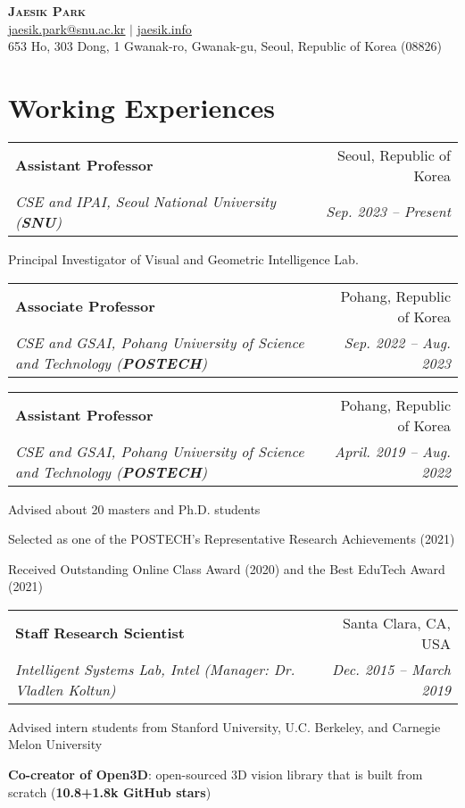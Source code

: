 \documentclass[letterpaper,11pt]{article}
\makeatletter
\newcommand{\resumeItem}[1]{
  \small{
  \item{#1 \vspace{-2pt}}
  }
}
\newcommand{\resumeSubheading}[4]{
  \vspace{-2pt}\item
    \begin{tabular*}{0.97\textwidth}[t]{l@{\extracolsep{\fill}}r}
      \textbf{#1} & #2 \\
      \textit{\small#3} & \textit{\small #4} \\
    \end{tabular*}\vspace{-7pt}
}
\newcommand{\resumeSubHeadingListStart}{\begin{itemize}[leftmargin=0.15in, label={}]}
\newcommand{\resumeSubHeadingListEnd}{\end{itemize}}
\newcommand{\resumeItemListStart}{\begin{itemize}}
\newcommand{\resumeItemListEnd}{\end{itemize}\vspace{-5pt}}
\makeatother
\begin{document}
\begin{center}
    \textbf{\Huge \scshape Jaesik Park} \\ \vspace{3pt}
    \small \href{mailto:jaesik.park@snu.ac.kr}{\underline{jaesik.park@snu.ac.kr}} $|$ 
    \href{http://jaesik.info}{\underline{jaesik.info}}\\
    \footnotesize{653 Ho, 303 Dong, 1 Gwanak-ro, Gwanak-gu, Seoul, Republic of Korea (08826)}
\end{center}

\section{Working Experiences}
  \resumeSubHeadingListStart
    \resumeSubheading
      {Assistant Professor}{Seoul, Republic of Korea}
      {CSE and IPAI, Seoul National University \textnormal{(\textbf{SNU})}}{Sep. 2023 -- Present}
      \resumeItemListStart
        \resumeItem{Principal Investigator of Visual and Geometric Intelligence Lab.}
      \resumeItemListEnd
    \resumeSubheading
      {Associate Professor}{Pohang, Republic of Korea}
      {CSE and GSAI, Pohang University of Science and Technology \textnormal{(\textbf{POSTECH})}}{Sep. 2022 -- Aug. 2023}
    \resumeSubheading
      {Assistant Professor}{Pohang, Republic of Korea}
      {CSE and GSAI, Pohang University of Science and Technology \textnormal{(\textbf{POSTECH})}}{April. 2019 -- Aug. 2022}
      \resumeItemListStart
        \resumeItem{Advised about 20 masters and Ph.D. students}
        \resumeItem{Selected as one of the POSTECH's Representative Research Achievements (2021)}
        \resumeItem{Received Outstanding Online Class Award (2020) and the Best EduTech Award (2021)}
      \resumeItemListEnd
    \resumeSubheading
      {Staff Research Scientist}{Santa Clara, CA, USA}
      {Intelligent Systems Lab, Intel (Manager: Dr. Vladlen Koltun)}{Dec. 2015 -- March 2019}
        \resumeItemListStart
          \resumeItem{Advised intern students from Stanford University, U.C. Berkeley, and Carnegie Melon University}
          \resumeItem{\textbf{Co-creator of Open3D}: open-sourced 3D vision library that is built from scratch (\textbf{10.8+1.8k GitHub stars})}
        \resumeItemListEnd
  \resumeSubHeadingListEnd
\end{document}
